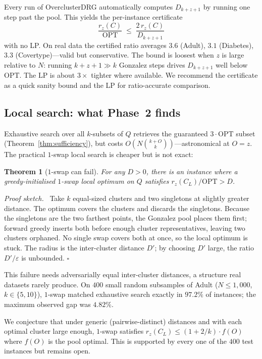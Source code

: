 \documentclass{siam}
\newtheorem{theorem}{Theorem}
\newenvironment{proof}[1][Proof]{\noindent\textit{#1.}\ }%
    {\hfill$\square$\par\medskip}%
\newcommand{\OPT}{\mathrm{OPT}}
\newcommand{\rz}{r_z}
\newcommand{\CL}{C_L}
\begin{document}
Every run of OverclusterDRG automatically computes $D_{k+z+1}$ by
running one step past the pool. This yields the per-instance certificate
\[
  \frac{\rz(C)}{\OPT} \;\le\; \frac{2\,\rz(C)}{D_{k+z+1}}
\]
with no LP. On real data the certified ratio averages $3.6$ (Adult),
$3.1$ (Diabetes), $3.3$ (Covertype)---valid but conservative. The
bound is loosest when $z$ is large relative to $N$: running
$k+z+1\gg k$ Gonzalez steps drives $D_{k+z+1}$ well below $\OPT$.
The LP is about $3\times$ tighter where available. We recommend the
certificate as a quick sanity bound and the LP for ratio-accurate
comparison.

\subsection{Local search: what Phase~2 finds}

Exhaustive search over all $k$-subsets of $Q$ retrieves the guaranteed
$3\cdot\OPT$ subset (Theorem~\ref{thm:sufficiency}), but costs
$O(N\binom{k+O}{k})$---astronomical at $O=z$. The practical
$1$-swap local search is cheaper but is not exact:

\begin{theorem}[$1$-swap can fail]
\label{thm:neg}
For any $D>0$, there is an instance where a greedy-initialised $1$-swap
local optimum on $Q$ satisfies $\rz(\CL)/\OPT>D$.
\end{theorem}

\begin{proof}[Proof sketch]
Take $k$ equal-sized clusters and two singletons at slightly greater
distance. The optimum covers the clusters and discards the singletons.
Because the singletons are the two farthest points, the Gonzalez pool
places them first; forward greedy inserts both before enough cluster
representatives, leaving two clusters orphaned. No single swap covers
both at once, so the local optimum is stuck. The radius is the
inter-cluster distance $D'$; by choosing $D'$ large, the ratio
$D'/\varepsilon$ is unbounded.
\end{proof}

This failure needs adversarially equal inter-cluster distances, a
structure real datasets rarely produce. On $400$ small random
subsamples of Adult ($N\le 1{,}000$, $k\in\{5,10\}$), $1$-swap matched
exhaustive search exactly in $97.2\%$ of instances; the maximum
observed gap was $4.82\%$.

We conjecture that under generic (pairwise-distinct) distances and with
each optimal cluster large enough, $1$-swap satisfies
$\rz(\CL)\le(1+2/k)\cdot f(O)$ where $f(O)$ is the pool optimal.
This is supported by every one of the $400$ test instances but remains
open.
\end{document}
